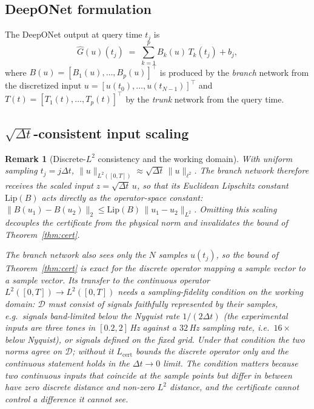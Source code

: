 \documentclass[11pt,sagev,times]{sagej}
\newtheorem{remark}{Remark}
\newcommand{\Ltwo}{L^2}
\newcommand{\Ghat}{\hat{G}}
\newcommand{\Lhat}{L_{\mathrm{cert}}}
\begin{document}
\subsection{DeepONet formulation}
The DeepONet output at query time $t_j$ is
\begin{equation}
  \Ghat(u)(t_j) \;=\; \sum_{k=1}^{p} B_k(u)\, T_k(t_j) + b_j,
  \label{eq:deeponet}
\end{equation}
where $B(u)=[B_1(u),\dots,B_p(u)]^\top$ is produced by the \emph{branch}
network from the discretized input $u=[u(t_0),\dots,u(t_{N-1})]^\top$ and
$T(t)=[T_1(t),\dots,T_p(t)]^\top$ by the \emph{trunk} network from the query
time.

\subsection{$\sqrt{\Delta t}$-consistent input scaling}
\begin{remark}[Discrete-$\Ltwo$ consistency and the working domain]\label{rem:sqrtdt}
With uniform sampling $t_j=j\Delta t$,
$\|u\|_{\Ltwo([0,T])}\approx\sqrt{\Delta t}\,\|u\|_{\ell^2}$.
The branch network therefore receives the scaled input
$z=\sqrt{\Delta t}\,u$, so that its Euclidean Lipschitz constant
$\mathrm{Lip}(B)$ acts directly as the operator-space constant:
$\|B(u_1)-B(u_2)\|_2\le\mathrm{Lip}(B)\,\|u_1-u_2\|_{\Ltwo}$.
Omitting this scaling decouples the certificate from the physical norm and
invalidates the bound of Theorem~\ref{thm:cert}.

The branch network also sees only the $N$ samples $u(t_j)$, so the bound of
Theorem~\ref{thm:cert} is \emph{exact for the discrete operator} mapping a
sample vector to a sample vector. Its transfer to the continuous operator
$\Ltwo([0,T])\to\Ltwo([0,T])$ needs a sampling-fidelity condition on the
working domain: $\mathcal{D}$ must consist of signals faithfully represented by
their samples, e.g.\ signals band-limited below the Nyquist rate
$1/(2\Delta t)$ (the experimental inputs are three tones in $[0.2,2]$\,Hz
against a $32$\,Hz sampling rate, i.e.\ $16\times$ below Nyquist), or signals
defined on the fixed grid. Under that condition the two norms agree on
$\mathcal{D}$; without it $\Lhat$ bounds the discrete operator only and the
continuous statement holds in the $\Delta t\to0$ limit. The condition matters
because two continuous inputs that coincide at the sample points but differ in
between have zero discrete distance and non-zero $\Ltwo$ distance, and the
certificate cannot control a difference it cannot see.
\end{remark}
\end{document}
